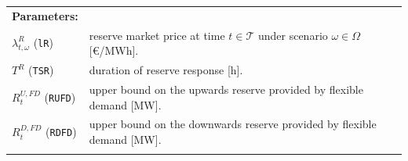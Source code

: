 \documentclass{article}
\begin{document}
\begin{tabularx}{\textwidth}{l l}
    \textbf{Parameters:} \\
    	$\lambda^{R}_{t, \omega}$ (\verb|lR|) & reserve market price at time $t \in \mathcal{T}$ under scenario $\omega \in \Omega$ [\euro/MWh]. \\
    	$T^R$ (\verb|TSR|) & duration of reserve response [h]. \\
    	$R^{U, FD}_t$ (\verb|RUFD|) & upper bound on the upwards reserve provided by flexible demand [MW]. \\
    	$R^{D, FD}_t$ (\verb|RDFD|) & upper bound on the downwards reserve provided by flexible demand [MW]. \\
    \\
       

\end{tabularx}
\end{document}
